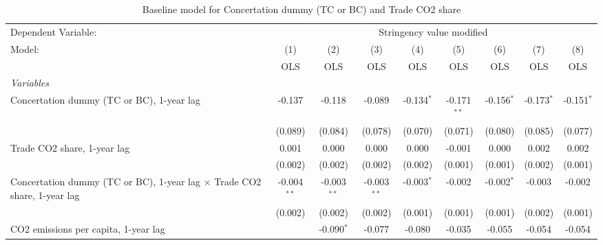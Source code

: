 
\begin{table}[htbp]
   \caption{Baseline model for Concertation dummy (TC or BC) and Trade CO2 share}
   \centering
   \begin{tabular}{lcccccccc}
      \toprule
      Dependent Variable: & \multicolumn{8}{c}{Stringency value modified}\\
      Model:                                                                          & (1)           & (2)           & (3)           & (4)          & (5)           & (6)           & (7)           & (8)\\  
                                                                                      &  OLS          & OLS           & OLS           & OLS          & OLS           & OLS           & OLS           & OLS\\  
      \midrule
      \emph{Variables}\\
      Concertation dummy (TC or BC), 1-year lag                                       & -0.137        & -0.118        & -0.089        & -0.134$^{*}$ & -0.171$^{**}$ & -0.156$^{*}$  & -0.173$^{*}$  & -0.151$^{*}$\\   
                                                                                      & (0.089)       & (0.084)       & (0.078)       & (0.070)      & (0.071)       & (0.080)       & (0.085)       & (0.077)\\   
      Trade CO2 share, 1-year lag                                                     & 0.001         & 0.000         & 0.000         & 0.000        & -0.001        & 0.000         & 0.002         & 0.002\\   
                                                                                      & (0.002)       & (0.002)       & (0.002)       & (0.002)      & (0.001)       & (0.001)       & (0.002)       & (0.001)\\   
      Concertation dummy (TC or BC), 1-year lag $\times$ Trade CO2 share, 1-year lag  & -0.004$^{**}$ & -0.003$^{**}$ & -0.003$^{**}$ & -0.003$^{*}$ & -0.002        & -0.002$^{*}$  & -0.003        & -0.002\\   
                                                                                      & (0.002)       & (0.002)       & (0.002)       & (0.001)      & (0.001)       & (0.001)       & (0.002)       & (0.001)\\   
      CO2 emissions per capita, 1-year lag                                            &               & -0.090$^{*}$  & -0.077        & -0.080       & -0.035        & -0.055        & -0.054        & -0.054\\   

\end{tabular}
\end{table}
